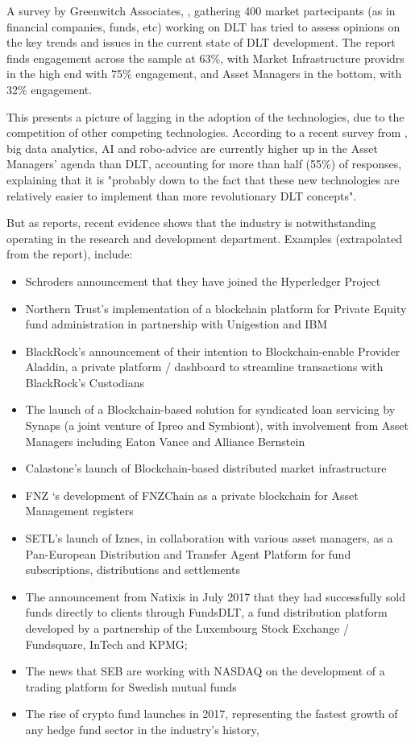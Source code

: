 A survey by Greenwitch Associates, \cite{greenwitchdltreport}, gathering 400 market partecipants (as in financial companies, funds, etc) working on DLT has tried to assess opinions on the key trends and issues in the current state of DLT development. The report finds engagement across the sample at 63\%, with Market Infrastructure providrs in the high end with 75\% engagement, and Asset Managers in the bottom, with 32\% engagement.

This presents a picture of lagging in the adoption of the technologies, due to the competition of other competing technologies. According to a recent survey from \cite{multifundssurvey}, big data analytics, AI and robo-advice are currently higher up in the Asset Managers' agenda than DLT, accounting for more than half (55\%) of responses, explaining that it is "probably down to the fact that these new technologies are relatively easier to implement than more revolutionary DLT concepts". 

But as \cite{ibmdltreport} reports, recent evidence shows that the industry is notwithstanding operating in the research and development department. 
Examples (extrapolated from the report), include:

\begin{itemize}
    \item Schroders announcement that they have joined the Hyperledger Project
    \item Northern Trust’s implementation of a blockchain platform for Private Equity fund administration in partnership with Unigestion and IBM
    \item BlackRock’s announcement of their intention to Blockchain-enable Provider Aladdin, a private platform / dashboard to streamline transactions with BlackRock’s Custodians
    \item The launch of a Blockchain-based solution for syndicated loan servicing by Synaps (a joint venture of Ipreo and Symbiont), with involvement from Asset Managers including Eaton Vance and Alliance Bernstein
    \item Calastone’s launch of Blockchain-based distributed market infrastructure
    \item FNZ ‘s development of FNZChain as a private blockchain for Asset Management registers
    \item SETL’s launch of Iznes, in collaboration with various asset managers, as a Pan-European Distribution and Transfer Agent Platform for fund subscriptions, distributions and
    settlements
    \item The announcement from Natixis in July 2017 that they had successfully sold funds directly to clients through FundsDLT, a fund distribution platform developed by a partnership of the Luxembourg Stock Exchange / Fundsquare, InTech and KPMG;
    \item The news that SEB are working with NASDAQ on the development of a trading platform for Swedish mutual funds
    \item The rise of crypto fund launches in 2017, representing the fastest growth of any hedge fund sector in the industry’s history, \cite{hedgefundcryptoreport}
\end{itemize}

